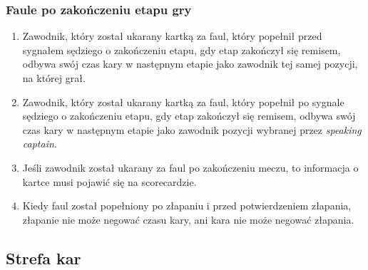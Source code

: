 \documentclass[11pt,a4paper]{article}
\begin{document}
\subsubsection{Faule po zakończeniu etapu gry}
\begin{enumerate}
  \item Zawodnik, który został ukarany kartką za faul, który popełnił przed sygnałem sędziego o zakończeniu etapu, gdy etap zakończył się remisem, odbywa swój czas kary w następnym etapie jako zawodnik tej samej pozycji, na której grał.
  \item Zawodnik, który został ukarany kartką za faul, który popełnił po sygnale sędziego o zakończeniu etapu, gdy etap zakończył się remisem, odbywa swój czas kary w następnym etapie jako zawodnik pozycji wybranej przez \emph{speaking captain}.
  \item Jeśli zawodnik został ukarany za faul po zakończeniu meczu, to informacja o kartce musi pojawić się na scorecardzie.
  \item Kiedy faul został popełniony po złapaniu i przed potwierdzeniem złapania, złapanie nie może negować czasu kary, ani kara nie może negować złapania.
\end{enumerate}

\subsection{Strefa kar}
\end{document}
